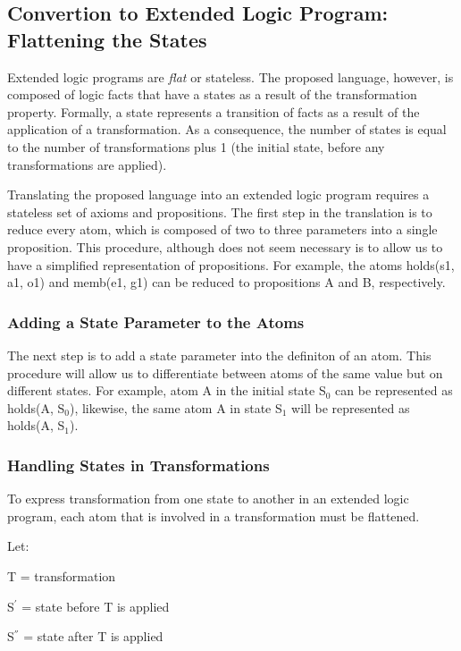 \documentclass[a4paper]{article}
\begin{document}
    \subsection{Convertion to Extended Logic Program: Flattening the States}

      Extended logic programs are \emph{flat} or stateless. The proposed
      language, however, is composed of logic facts that have a states as
      a result of the transformation property. Formally, a state represents
      a transition of facts as a result of the application of a transformation.
      As a consequence, the number of states is equal to the number of
      transformations plus 1 (the initial state, before any transformations
      are applied).

      Translating the proposed language into an extended logic program requires
      a stateless set of axioms and propositions. The first step in the 
      translation is to reduce every atom, which is composed of two to three
      parameters into a single proposition. This procedure, although does not
      seem necessary is to allow us to have a simplified representation of
      propositions. For example, the atoms holds(s1, a1, o1) and memb(e1, g1)
      can be reduced to propositions A and B, respectively.

      \subsubsection{Adding a State Parameter to the Atoms}

        The next step is to add a state parameter into the definiton of an
        atom. This procedure will allow us to differentiate between atoms of
        the same value but on different states. For example, atom A in 
        the initial state S$_0$ can be represented as holds(A, S$_0$),
        likewise, the same atom A in state S$_1$ will be represented as
        holds(A, S$_1$).

      \subsubsection{Handling States in Transformations}

        To express transformation from one state to another in an extended
        logic program, each atom that is involved in a transformation must
        be flattened.

        Let:
  
        \begin{list}{}{}
          \item T = transformation
          \item S$^{'}$ = state before T is applied
          \item S$^{''}$ = state after T is applied
        \end{list}
  
\end{document}
